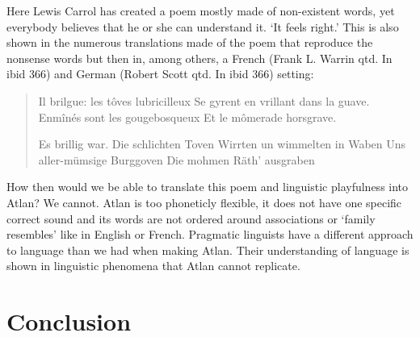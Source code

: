 \noindent Here Lewis Carrol has created a poem mostly made of non-existent words, yet everybody believes that he or she can understand it. ‘It feels right.’ This is also shown in the numerous translations made of the poem that reproduce the nonsense words but then in, among others, a French (Frank L. Warrin qtd. In ibid 366) and German (Robert Scott qtd. In ibid 366) setting: 

\begin{quote}
Il brilgue: les t\^{o}ves lubricilleux 
Se gyrent en vrillant dans la guave. 
Enm\^{i}n\'{e}s sont les gougebosqueux 
Et le m\^{o}merade horsgrave.  

Es brillig war. Die schlichten Toven 
Wirrten un wimmelten in Waben 
Uns aller-m\"{u}msige Burggoven 
Die mohmen R\"{a}th’ ausgraben 
\end{quote}

\noindent How then would we be able to translate this poem and linguistic playfulness into Atlan? We cannot. Atlan is too phoneticly flexible, it does not have one specific correct sound and its words are not ordered around associations or ‘family resembles’ like in English or French. Pragmatic linguists have a different approach to language than we had when making Atlan. Their understanding of language is shown in linguistic phenomena that Atlan cannot replicate.   

\section{Conclusion}

